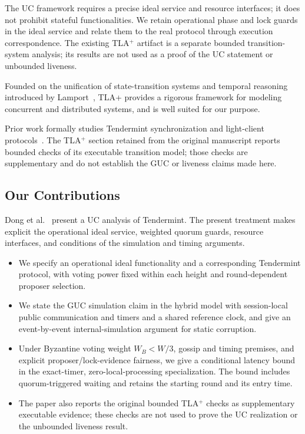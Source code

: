 \documentclass[conference,letterpaper,10pt]{IEEEtran}
\begin{document}
The UC framework requires a precise ideal service and resource interfaces; it does not prohibit stateful functionalities. We retain operational phase and lock guards in the ideal service and relate them to the real protocol through execution correspondence. The existing TLA$^+$ artifact is a separate bounded transition-system analysis; its results are not used as a proof of the UC statement or unbounded liveness.

Founded on the unification of state-transition systems and temporal reasoning introduced by Lamport~\cite{lamport1994temporal,lamport1999specifying}, TLA+ provides a rigorous framework for modeling concurrent and distributed systems, and is well suited for our purpose.

Prior work formally studies Tendermint synchronization and light-client protocols~\cite{braithwaite2020formal,braithwaite2020tendermint}. The TLA$^+$ section retained from the original manuscript reports bounded checks of its executable transition model; those checks are supplementary and do not establish the GUC or liveness claims made here.

\subsection{Our Contributions}\label{sec:contributions}

Dong et al.~\cite{dong2025uctendermint} present a UC analysis of Tendermint. The present treatment makes explicit the operational ideal service, weighted quorum guards, resource interfaces, and conditions of the simulation and timing arguments.

\begin{itemize}
    \setlength{\itemsep}{0pt}
    \setlength{\parsep}{0pt}
    \setlength{\topsep}{2pt}
    \item We specify an operational ideal functionality and a corresponding Tendermint protocol, with voting power fixed within each height and round-dependent proposer selection.

    \item We state the GUC simulation claim in the hybrid model with session-local public communication and timers and a shared reference clock, and give an event-by-event internal-simulation argument for static corruption.

    \item Under Byzantine voting weight $W_B<W/3$, gossip and timing premises, and explicit proposer/lock-evidence fairness, we give a conditional latency bound in the exact-timer, zero-local-processing specialization. The bound includes quorum-triggered waiting and retains the starting round and its entry time.

    \item The paper also reports the original bounded TLA$^+$ checks as supplementary executable evidence; these checks are not used to prove the UC realization or the unbounded liveness result.

\end{itemize}
\end{document}
